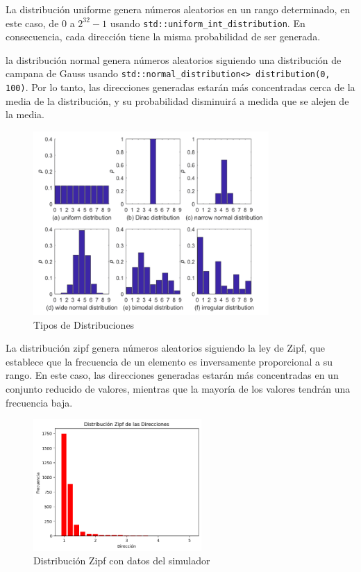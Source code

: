 \documentclass[12pt]{article}
\begin{document}
La distribución uniforme genera números aleatorios en un rango determinado, en este caso, de $0$ a $2^{32}-1$ usando \lstinline|std::uniform_int_distribution|. En consecuencia, cada dirección tiene la misma probabilidad de ser generada.
\newline

la distribución normal genera números aleatorios siguiendo una distribución de campana de Gauss usando \lstinline|std::normal_distribution<> distribution(0, 100)|. Por lo tanto, las direcciones generadas estarán más concentradas cerca de la media de la distribución, y su probabilidad disminuirá a medida que se alejen de la media. 

\begin{figure}[h]
	\centering
	\includegraphics[width=0.8\textwidth]{test-distributions.png}
	\caption{Tipos de Distribuciones \cite{darscheid_maximum-entropy_2018}}
	\label{fig:uni_normal_dist}
\end{figure}

La distribución zipf genera números aleatorios siguiendo la ley de Zipf, que establece que la frecuencia de un elemento es inversamente proporcional a su rango. En este caso, las direcciones generadas estarán más concentradas en un conjunto reducido de valores, mientras que la mayoría de los valores tendrán una frecuencia baja.

\begin{figure}[h]
	\centering
	\includegraphics[width=0.57\textwidth]{zipf.png}
	\caption{Distribución Zipf con datos del simulador}
	\label{fig:zipf_dist}
\end{figure}
\end{document}
